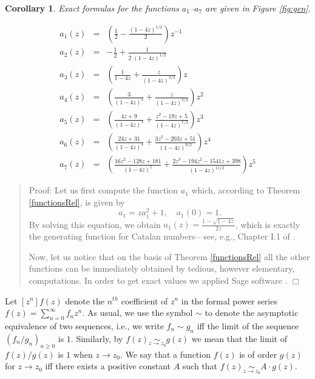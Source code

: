 \documentclass{jfp1}
\newenvironment{proof}[1]{\begin{quotation}\noindent\textsf{Proof:} #1}
{\(\Box\)\end{quotation}}
\newtheorem{corollary}[theo]{Corollary}
\newcommand\subrel[2]{\mathrel{\mathop{#2}\limits_{#1}}}
\newcommand{\simtozero}{\subrel{z \to z_0}{\sim}}
\begin{document}
\begin{corollary}\label{functions}
Exact formulas for the functions $a_1$--$a_7$ are given in Figure \ref{fig:gen}.
\begin{figure*}
\newcommand{\RHOF}{\sqrt{1-4z}}
  \centering
    \begin{eqnarray*}
      a_1(z) &=& \left( \frac{1}{2}-\frac{(1-4z)^{1/2}}{2}\right) z^{-1}\\
      a_2(z) &=& -\frac{1}{2} + \frac{1}{2\;(1-4z)^{1/2}}\\
a_3(z) &=& \left( \frac{1}{1-4z} + \frac{z}{(1-4z)^{3/2}} \right) z\\
a_4(z) &=& \left( \frac{3}{(1-4z)^2} + \frac{z}{(1-4z)^{5/2}} \right) z^2\\
a_5(z) &=& \left( \frac{4z+9}{(1-4z)^3} + \frac{z^2 - 19z + 5}{(1-4z)^{7/2}} \right) z^3\\   	
a_6(z) &=& \left( \frac{24z+31}{(1-4z)^4} + \frac{3z^2 - 203z + 51}{(1-4z)^{9/2}} \right) z^4\\
a_7(z) &=& \left( \frac{16z^2 - 128z + 181}{(1-4z)^5} + \frac{2z^3 - 194z^2 - 1541z + 398}{(1-4z)^{11/2}} \right) z^5
\end{eqnarray*}
    \caption{The generating functions for the coefficients of the polynomials $P_n(m)$}
\label{fig:gen}
\end{figure*}
\end{corollary}

\begin{proof}
Let us first compute the function $a_1$ which, according to Theorem \ref{functionsRel}, is given by
\[a_1 = za_1^2 + 1, \quad a_1(0)=1.\] By solving this equation, we obtain $a_1(z) =
\frac{1-\sqrt{1-4z}}{2z}$, which is exactly the generating function for Catalan
numbers---see, e.g., Chapter I.1 of \cite{flajolet08:_analy_combin}.

Now, let us notice that on the basis of Theorem \ref{functionsRel} all the other functions can be immediately obtained by tedious, however elementary, computations. In order to get exact values we applied \textsf{Sage} software \cite{sage}.
\end{proof}

Let $[z^n]f(z)$ denote the $n^{th}$ coefficient of $z^n$ in the formal power series
$f(z) = \sum_{n=0}^{\infty} f_n z^n$. As usual, we use the symbol $\sim$ to denote
the asymptotic equivalence of two sequences, i.e., we write $f_n \sim g_n$ iff the
limit of the sequence $(f_n/g_n)_{n\geq 0}$ is $1$. Similarly, by $f(z) \simtozero g(z)$ we mean that the limit of $f(z)/g(z)$ is $1$ when $z \to z_0$.
We say that a function $f(z)$ is of order $g(z)$ for $z \to z_0$ iff there exists a
positive constant $A$ such that $f(z) \simtozero A\cdot g(z)$.
\end{document}
